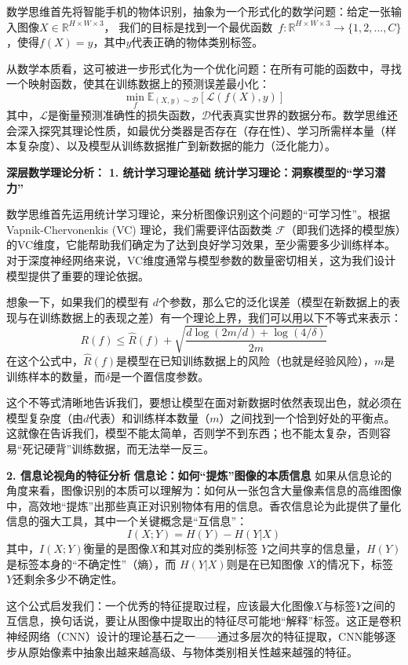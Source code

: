 数学思维首先将智能手机的物体识别，抽象为一个形式化的数学问题：给定一张输入图像$X \in \mathbb{R}^{H \times W \times 3}$，
我们的目标是找到一个最优函数~$f: \mathbb{R}^{H \times W \times 3} \rightarrow \{1, 2, ..., C\}$，使得$f(X) = y$，其中$y$代表正确的物体类别标签。

从数学本质看，这可被进一步形式化为一个优化问题：在所有可能的函数中，寻找一个映射函数，使其在训练数据上的预测误差最小化：
$$\min_{f} \mathbb{E}_{(X,y) \sim \mathcal{D}}[\mathcal{L}(f(X), y)]$$
其中，$\mathcal{L}$是衡量预测准确性的损失函数，$\mathcal{D}$代表真实世界的数据分布。数学思维还会深入探究其理论性质，如最优分类器是否存在（存在性）、学习所需样本量（样本复杂度）、以及模型从训练数据推广到新数据的能力（泛化能力）。
 

\textbf{深层数学理论分析：}
\textbf{1. 统计学习理论基础}
\textbf{统计学习理论：洞察模型的“学习潜力”}

数学思维首先运用统计学习理论，来分析图像识别这个问题的“可学习性”。根据 Vapnik-Chervonenkis (VC) 理论，我们需要评估函数类 $\mathcal{F}$（即我们选择的模型族）的VC维度，它能帮助我们确定为了达到良好学习效果，至少需要多少训练样本。对于深度神经网络来说，VC维度通常与模型参数的数量密切相关，这为我们设计模型提供了重要的理论依据。

想象一下，如果我们的模型有 $d$个参数，那么它的泛化误差（模型在新数据上的表现与在训练数据上的表现之差）有一个理论上界，我们可以用以下不等式来表示：
$$R(f) \leq \hat{R}(f) + \sqrt{\frac{d \log(2m/d) + \log(4/\delta)}{2m}}$$
在这个公式中，$\hat{R}(f)$是模型在已知训练数据上的风险（也就是经验风险），$m$是训练样本的数量，而$\delta$是一个置信度参数。

这个不等式清晰地告诉我们，要想让模型在面对新数据时依然表现出色，就必须在模型复杂度（由$d$代表）和训练样本数量（$m$）之间找到一个恰到好处的平衡点。这就像在告诉我们，模型不能太简单，否则学不到东西；也不能太复杂，否则容易“死记硬背”训练数据，而无法举一反三。
 
 \textbf{2. 信息论视角的特征分析}
\textbf{信息论：如何“提炼”图像的本质信息}
如果从信息论的角度来看，图像识别的本质可以理解为：如何从一张包含大量像素信息的高维图像中，高效地“提炼”出那些真正对识别物体有用的信息。香农信息论为此提供了量化信息的强大工具，其中一个关键概念是“互信息”：
$$I(X; Y) = H(Y) - H(Y|X)$$
其中，$I(X; Y)$衡量的是图像$X$和其对应的类别标签 $Y$之间共享的信息量，$H(Y)$ 是标签本身的“不确定性”（熵），而 $H(Y|X)$则是在已知图像 $X$的情况下，标签 $Y$还剩余多少不确定性。

这个公式启发我们：一个优秀的特征提取过程，应该最大化图像$X$与标签$Y$之间的互信息，换句话说，要让从图像中提取出的特征尽可能地“解释”标签。这正是卷积神经网络（CNN）设计的理论基石之一——通过多层次的特征提取，CNN能够逐步从原始像素中抽象出越来越高级、与物体类别相关性越来越强的特征。

